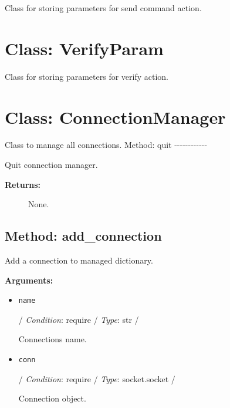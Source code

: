Class for storing parameters for send command action.

\hypertarget{qconnectbase-connection-manager-class-verifyparam-25}{%
\section{Class: VerifyParam}\label{qconnectbase-connection-manager-class-verifyparam-25}}

\begin{Shaded}
\begin{Highlighting}[]
\end{Highlighting}
\end{Shaded}

Class for storing parameters for verify action.

\hypertarget{qconnectbase-connection-manager-class-connectionmanager-26}{%
\section{Class: ConnectionManager}\label{qconnectbase-connection-manager-class-connectionmanager-26}}

\begin{Shaded}
\begin{Highlighting}[]
\end{Highlighting}
\end{Shaded}

Class to manage all connections. Method: quit
-\/-\/-\/-\/-\/-\/-\/-\/-\/-\/-\/-

Quit connection manager.

\begin{description}
\item[\textbf{Returns:}]
None.
\end{description}

\hypertarget{qconnectbase-connection-manager-method-add_connection-27}{%
\subsection{Method: add\_connection}\label{qconnectbase-connection-manager-method-add_connection-27}}

Add a connection to managed dictionary.

\textbf{Arguments:}

\begin{itemize}
\item
  \texttt{name}

  / \emph{Condition}: require / \emph{Type}: str /

  Connection\textquotesingle s name.
\item
  \texttt{conn}

  / \emph{Condition}: require / \emph{Type}: socket.socket /

  Connection object.
\end{itemize}

